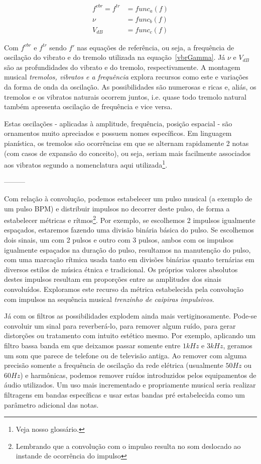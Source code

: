 \begin{equation}
\begin{split}
f^{vbr} = f^{tr} & = func_a(f) \\
\nu & = func_b(f) \\
V_{dB} & = func_c(f)
\end{split}
\end{equation}

Com $f^{vbr}$ e $f^{tr}$ sendo $f'$ nas equações de referência, ou seja, a frequência
de oscilação do vibrato e do tremolo utilizada na equação~\ref{vbrGamma}. Já $\nu$ e $V_{dB}$ são as profundidades
do vibrato e do tremolo, respectivamente. A montagem musical 
\emph{tremolos, vibratos e a frequência} explora
recursos como este e variações da forma de onda da oscilação. As possibilidades
são numerosas e ricas e, aliás, os tremolos e os vibratos naturais ocorrem
juntos, i.e. quase todo tremolo natural também apresenta oscilação de frequência
e vice versa.

Estas oscilações - aplicadas à amplitude, frequência, posição espacial - são ornamentos muito apreciados e possuem nomes
específicos. Em linguagem pianística,
os tremolos são ocorrências em que se alternam rapidamente 2 notas (com
casos de expansão do conceito), ou seja, seriam mais facilmente associados aos vibratos
segundo a nomenclatura aqui utilizada\footnote{Veja nosso glossário.}.

---------

Com relação à convolução, podemos estabelecer um pulso musical (a exemplo de um pulso BPM)
e distribuir impulsos no decorrer deste pulso, de forma a estabelecer métricas e rítmos\footnote{Lembrando
que a convolução com o impulso resulta no som deslocado ao instande de ocorrência do impulso}.
Por exemplo, se escolhemos 2 impulsos igualmente espaçados, estaremos fazendo uma
divisão binária básica do pulso. Se escolhemos dois sinais, um com 2 pulsos e outro com 3 pulsos,
ambos com os impulsos igualmente espaçados na duração do pulso, resultamos na manutenção
do pulso, com uma marcação rítmica usada tanto em divisões binárias quanto ternárias em diversos
estilos de música étnica e tradicional. 
Os próprios valores absolutos destes impulsos resultam em proporções entre as amplitudes dos sinais
convoluídos.
Exploramos este recurso da métrica
estabelecida pela convolução com impulsos na sequência musical \emph{trenzinho de caipiras impulsivos}.

Já com os filtros as possibilidades explodem ainda mais vertiginosamente. Pode-se convoluir um sinal para reverberá-lo, para
remover algum ruído, para gerar distorções ou tratamento com intuito estético mesmo. Por exemplo,
aplicando um filtro bassa banda em que deixamos passar somente entre $1kHz$ e $3kHz$, geramos um som
que parece de telefone ou de televisão antiga. Ao remover com alguma precisão somente
a frequência de oscilação da rede elétrica (usualmente $50Hz$ ou $60Hz$) e harmônicas, podemos remover
ruídos introduzidos pelos equipamentos de áudio utilizados. Um uso mais incrementado
e propriamente musical seria realizar filtragens em bandas específicas e usar estas bandas
pré estabelecida como um parâmetro adicional das notas.


